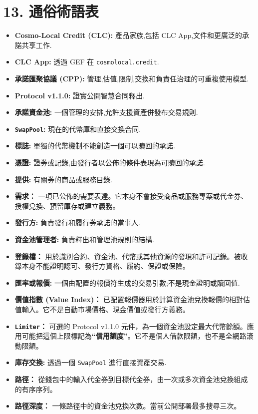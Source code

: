 \documentclass[11pt]{article}
\begin{document}
\section*{13. 通俗術語表}

\begin{itemize}[leftmargin=*]
\item \textbf{Cosmo-Local Credit (CLC):} 產品家族,包括 CLC App,文件和更廣泛的承諾共享工作.
\item \textbf{CLC App:} 透過 GEF 在 \texttt{cosmolocal.credit}.
\item \textbf{承諾匯聚協議 (CPP):} 管理,估值,限制,交換和負責任治理的可重複使用模型.
\item \textbf{Protocol v1.1.0:} 證實公開智慧合同釋出.
\item \textbf{承諾資金池:} 一個管理的安排,允許支援資產併發布交易規則.
\item \textbf{\texttt{SwapPool}:} 現在的代幣庫和直接交換合同.
\item \textbf{標誌:} 單獨的代幣機制不能創造一個可以贖回的承諾.
\item \textbf{憑證:} 證券或記錄,由發行者以公佈的條件表現為可贖回的承諾.
\item \textbf{提供:} 有關券的商品或服務目錄.
\item \textbf{需求：} 一項已公佈的需要表達。它本身不會接受商品或服務專案或代金券、授權兌換、預留庫存或建立義務。
\item \textbf{發行方:} 負責發行和履行券承諾的當事人.
\item \textbf{資金池管理者:} 負責釋出和管理池規則的結構.
\item \textbf{登錄檔：} 用於識別合約、資金池、代幣或其他資源的發現和許可記錄。被收錄本身不能證明認可、發行方資格、履約、保證或保險。
\item \textbf{匯率或報價:} 一個由配置的報價符生成的交易引數;不是現金證明或贖回值.
\item \textbf{價值指數 (Value Index)：} 已配置報價器用於計算資金池兌換報價的相對估值輸入。它不是自動市場價格、現金價值或發行方義務。
\item \textbf{\texttt{Limiter}：} 可選的 Protocol v1.1.0 元件，為一個資金池設定最大代幣餘額。應用可能把這個上限標記為\textbf{``信用額度''}。它不是個人借款限額，也不是全網路滾動限額。
\item \textbf{庫存交換:} 透過一個 \texttt{SwapPool} 進行直接資產交易.
\item \textbf{路徑：} 從錢包中的輸入代金券到目標代金券，由一次或多次資金池兌換組成的有序序列。
\item \textbf{路徑深度：} 一條路徑中的資金池兌換次數。當前公開部署最多搜尋三次。

\end{itemize}
\end{document}
